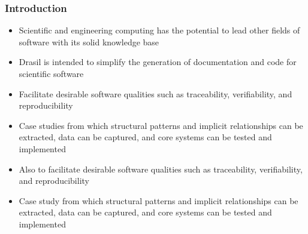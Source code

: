 \documentclass{beamer}
\begin{document}
\begin{frame}
\frametitle{Introduction}
\begin{itemize}
 \item<1-> Scientific and engineering computing has the potential to lead other fields of software with its solid knowledge base
 \item<2-> Drasil is intended to simplify the generation of documentation and code for scientific software
 \item<3-> Facilitate desirable software qualities such as traceability, verifiability, and reproducibility
 \item<4-> Case studies from which structural patterns and implicit relationships can be extracted, data can be captured, and core systems can be tested and implemented
 \item<3-> Also to facilitate desirable software qualities such as traceability, verifiability, and reproducibility
 \item<4-> Case study from which structural patterns and implicit relationships can be extracted, data can be captured, and core systems can be tested and implemented
\end{itemize}
\end{frame}
\end{document}
